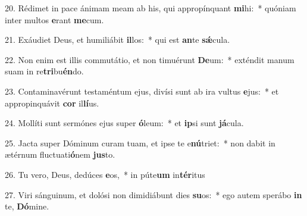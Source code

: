 20. Rédimet in pace ánimam meam ab his, qui appropínquant \textbf{mi}hi:~*  quóniam inter multos \textbf{e}rant \textbf{me}cum.\

21. Exáudiet Deus, et humiliábit \textbf{il}los:~*  qui est \textbf{an}te \textbf{sǽ}cula.\

22. Non enim est illis commutátio, et non timuérunt \textbf{De}um:~*  exténdit manum suam in re\textbf{tri}bu\textbf{én}do.\

23. Contaminavérunt testaméntum ejus, divísi sunt ab ira vultus \textbf{e}jus:~*  et appropinquávit \textbf{cor} il\textbf{lí}us.\

24. Mollíti sunt sermónes ejus super \textbf{ó}leum:~*  et \textbf{ip}si sunt \textbf{já}cula.\

25. Jacta super Dóminum curam tuam, et ipse te e\textbf{nú}triet:~*  non dabit in ætérnum fluctuati\textbf{ó}nem \textbf{jus}to.\

26. Tu vero, Deus, dedúces \textbf{e}os,~*  in púte\textbf{um} in\textbf{tér}itus\

27. Viri sánguinum, et dolósi non dimidiábunt dies \textbf{su}os:~*  ego autem sperábo \textbf{in} te, \textbf{Dó}mine.\

